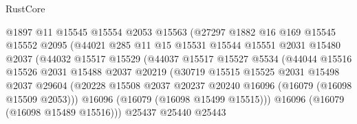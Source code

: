 \begin{lexlean}{RustCore}
\begin{coremodule}
                              @1897
                              @11
                              @15545
                              @15554
                              @2053
                              @15563
                              (@27297
                                @1882
                                @16
                                @169
                                @15545
                                @15552
                                @2095
                                (@44021
                                  @285
                                  @11
                                  @15
                                  @15531
                                  @15544
                                  @15551
                                  @2031
                                  @15480
                                  @2037
                                  (@44032
                                    @15517
                                    @15529
                                    (@44037
                                      @15517
                                      @15527
                                      @5534
                                      (@44044
                                        @15516
                                        @15526
                                        @2031
                                        @15488
                                        @2037
                                        @20219
                                        (@30719
                                          @15515
                                          @15525
                                          @2031
                                          @15498
                                          @2037
                                          @29604
                                          (@20228
                                            @15508
                                            @2037
                                            @20237
                                            @20240
                                            @16096
                                            (@16079 (@16098 @15509 @2053)))
                                          @16096
                                          (@16079 (@16098 @15499 @15515)))
                                        @16096
                                        (@16079 (@16098 @15489 @15516)))
                                      @25437
                                      @25440
                                      @25443

\end{coremodule}
\end{lexlean}
